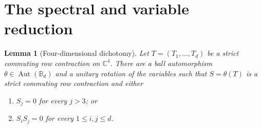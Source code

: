 \documentclass[11pt]{article}
\newtheorem{lemma}[theorem]{Lemma}
\theoremstyle{remark}
\newcommand{\B}{\mathbb B}
\newcommand{\C}{\mathbb C}
\begin{document}
\section{The spectral and variable reduction}

\begin{lemma}[Four-dimensional dichotomy]\label{lem:dichotomy}
Let $T=(T_1,\ldots,T_d)$ be a strict commuting row contraction on $\C^4$.
There are a ball automorphism $\theta\in\operatorname{Aut}(\B_d)$ and a
unitary rotation of the variables such that $S=\theta(T)$ is a strict
commuting row contraction and either
\begin{enumerate}[label=\textup{(\roman*)}]
\item $S_j=0$ for every $j>3$; or
\item $S_iS_j=0$ for every $1\leq i,j\leq d$.
\end{enumerate}
\end{lemma}
\end{document}
